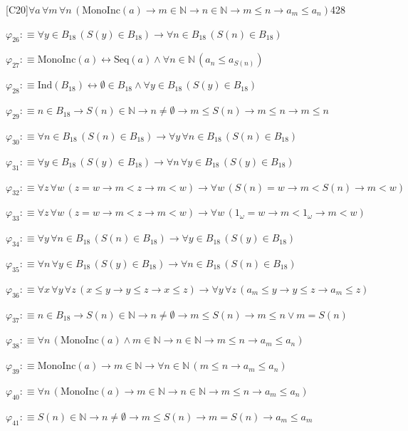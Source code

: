 \begin{fullproof}{[C20]}{$\forall a\,\forall m\,\forall n\,(\mathrm{MonoInc}(a) \to m \in \mathbb{N} \to n \in \mathbb{N} \to m \leq n \to a_{m} \leq a_{n})$}{428}
\begin{abbrevlist}
\item $\varphi_{26} :\equiv \forall y \in B_{18}\,(S(y) \in B_{18}) \to \forall n \in B_{18}\,(S(n) \in B_{18})$
\item $\varphi_{27} :\equiv \mathrm{MonoInc}(a) \leftrightarrow \mathrm{Seq}(a) \land \forall n \in \mathbb{N}\,(a_{n} \leq a_{S(n)})$
\item $\varphi_{28} :\equiv \mathrm{Ind}(B_{18}) \leftrightarrow \emptyset \in B_{18} \land \forall y \in B_{18}\,(S(y) \in B_{18})$
\item $\varphi_{29} :\equiv n \in B_{18} \to S(n) \in \mathbb{N} \to n \neq \emptyset \to m \leq S(n) \to m \leq n \to m \leq n$
\item $\varphi_{30} :\equiv \forall n \in B_{18}\,(S(n) \in B_{18}) \to \forall y\,\forall n \in B_{18}\,(S(n) \in B_{18})$
\item $\varphi_{31} :\equiv \forall y \in B_{18}\,(S(y) \in B_{18}) \to \forall n\,\forall y \in B_{18}\,(S(y) \in B_{18})$
\item $\varphi_{32} :\equiv \forall z\,\forall w\,(z = w \to m < z \to m < w) \to \forall w\,(S(n) = w \to m < S(n) \to m < w)$
\item $\varphi_{33} :\equiv \forall z\,\forall w\,(z = w \to m < z \to m < w) \to \forall w\,(1_{\omega} = w \to m < 1_{\omega} \to m < w)$
\item $\varphi_{34} :\equiv \forall y\,\forall n \in B_{18}\,(S(n) \in B_{18}) \to \forall y \in B_{18}\,(S(y) \in B_{18})$
\item $\varphi_{35} :\equiv \forall n\,\forall y \in B_{18}\,(S(y) \in B_{18}) \to \forall n \in B_{18}\,(S(n) \in B_{18})$
\item $\varphi_{36} :\equiv \forall x\,\forall y\,\forall z\,(x \leq y \to y \leq z \to x \leq z) \to \forall y\,\forall z\,(a_{m} \leq y \to y \leq z \to a_{m} \leq z)$
\item $\varphi_{37} :\equiv n \in B_{18} \to S(n) \in \mathbb{N} \to n \neq \emptyset \to m \leq S(n) \to m \leq n \lor m = S(n)$
\item $\varphi_{38} :\equiv \forall n\,(\mathrm{MonoInc}(a) \land m \in \mathbb{N} \to n \in \mathbb{N} \to m \leq n \to a_{m} \leq a_{n})$
\item $\varphi_{39} :\equiv \mathrm{MonoInc}(a) \to m \in \mathbb{N} \to \forall n \in \mathbb{N}\,(m \leq n \to a_{m} \leq a_{n})$
\item $\varphi_{40} :\equiv \forall n\,(\mathrm{MonoInc}(a) \to m \in \mathbb{N} \to n \in \mathbb{N} \to m \leq n \to a_{m} \leq a_{n})$
\item $\varphi_{41} :\equiv S(n) \in \mathbb{N} \to n \neq \emptyset \to m \leq S(n) \to m = S(n) \to a_{m} \leq a_{m}$

\end{abbrevlist}
\end{fullproof}
